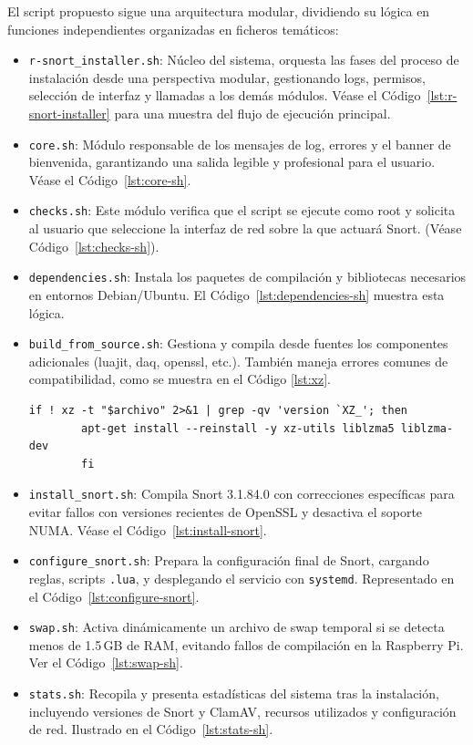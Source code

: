 \documentclass[11pt,a4paper,twoside]{report}
\begin{document}
El script propuesto sigue una arquitectura modular, dividiendo su lógica en funciones independientes organizadas en ficheros temáticos:

\begin{itemize}
	\item \texttt{r-snort\_installer.sh}: Núcleo del sistema, orquesta las fases del proceso de instalación desde una perspectiva modular, gestionando logs, permisos, selección de interfaz y llamadas a los demás módulos.  
	Véase el Código~\ref{lst:r-snort-installer} para una muestra del flujo de ejecución principal.
	
	\item \texttt{core.sh}: Módulo responsable de los mensajes de log, errores y el banner de bienvenida, garantizando una salida legible y profesional para el usuario.  
	Véase el Código~\ref{lst:core-sh}.
	
	\item \texttt{checks.sh}: Este módulo verifica que el script se ejecute como root y solicita al usuario que seleccione la interfaz de red sobre la que actuará Snort.  
	(Véase Código~\ref{lst:checks-sh}).
	
	\item \texttt{dependencies.sh}: Instala los paquetes de compilación y bibliotecas necesarios en entornos Debian/Ubuntu.  
	El Código~\ref{lst:dependencies-sh} muestra esta lógica.
	
	\item \texttt{build\_from\_source.sh}: Gestiona y compila desde fuentes los componentes adicionales (luajit, daq, openssl, etc.).  
	También maneja errores comunes de compatibilidad, como se muestra en el Código \ref{lst:xz}.
	
	\begin{lstlisting}[style=snortstyle, caption={Corrección de versiones incompatibles de xz/liblzma.}, label=lst:xz]
		if ! xz -t "$archivo" 2>&1 | grep -qv 'version `XZ_'; then
		apt-get install --reinstall -y xz-utils liblzma5 liblzma-dev
		fi
	\end{lstlisting}
	
	\item \texttt{install\_snort.sh}: Compila Snort 3.1.84.0 con correcciones específicas para evitar fallos con versiones recientes de OpenSSL y desactiva el soporte NUMA.  
	Véase el Código~\ref{lst:install-snort}.
	
	\item \texttt{configure\_snort.sh}: Prepara la configuración final de Snort, cargando reglas, scripts \texttt{.lua}, y desplegando el servicio con \texttt{systemd}.  
	Representado en el Código~\ref{lst:configure-snort}.
	
	\item \texttt{swap.sh}: Activa dinámicamente un archivo de swap temporal si se detecta menos de 1.5\,GB de RAM, evitando fallos de compilación en la Raspberry Pi.  
	Ver el Código~\ref{lst:swap-sh}.
	
	\item \texttt{stats.sh}: Recopila y presenta estadísticas del sistema tras la instalación, incluyendo versiones de Snort y ClamAV, recursos utilizados y configuración de red.  
	Ilustrado en el Código~\ref{lst:stats-sh}.
\end{itemize}
\end{document}
